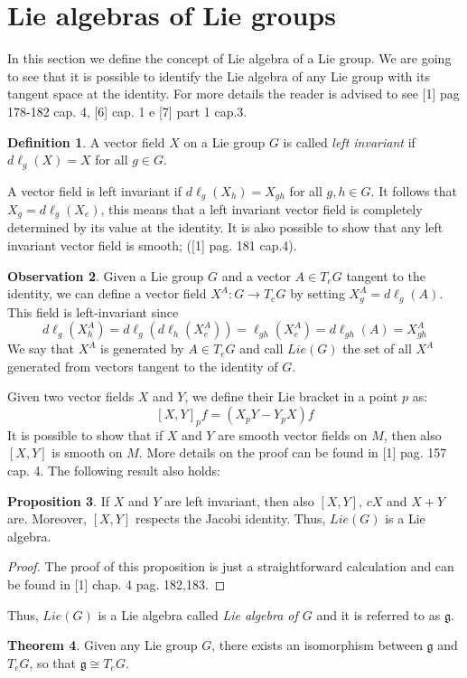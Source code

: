 \documentclass[12pt,a4paper]{report}
\theoremstyle{definition}
\newtheorem{Def}{Definition}[chapter]
\theoremstyle{Theorem}
\newtheorem{Theo}[Def]{Theorem}
\newtheorem{Prop}[Def]{Proposition}
\theoremstyle{definition}
\theoremstyle{definition}
\newtheorem{Obs}[Def]{Observation}
\begin{document}
	\section{Lie algebras of Lie groups}
	In this section we define the concept of Lie algebra of a Lie group. We are going to see that it is possible to identify the Lie algebra of any Lie group with its tangent space at the identity. For more details the reader is advised to see [1] pag 178-182 cap. 4, [6] cap. 1 e [7] part 1 cap.3.
	\begin{Def}
		A vector field $X$ on a Lie group $G$ is called \textit{left invariant} if $d\ell_g(X)=X$ for all $g\in G$.
	\end{Def}
	A vector field is left invariant if $d\ell_g(X_h)=X_{gh}$ for all $g,h\in G$.
	It follows that $X_g=d\ell_g(X_e)$, this means that a left invariant vector field is completely determined by its value at the identity. It is also possible to show that any left invariant vector field is smooth; ([1] pag. 181 cap.4).
	\begin{Obs} \label{Obs: 2.2}
		Given a Lie group $G$ and a vector $A\in T_eG$ tangent to the identity, we can define a vector field $X^A:G\rightarrow T_eG$ by setting $X^A_g=d\ell_g(A)$. This field is left-invariant since $$d\ell_g(X^A_h)=d\ell_g(d\ell_h(X^A_e))=\ell_{gh}(X^A_e)=d\ell_{gh}(A)=X^A_{gh}$$
		We say that $X^A$ is generated by $A\in T_eG$ and call $Lie(G)$ the set of all $X^A$ generated from vectors tangent to the identity of $G$.	
	\end{Obs}
	Given two vector fields $X$ and $Y$, we define their Lie bracket in a point $p$ as:
	$$[X,Y]_pf=(X_pY-Y_pX)f$$
	It is possible to show that if $X$ and $Y$ are smooth vector fields on $M$, then also $[X,Y]$ is smooth on $M$. More details on the proof can be found in [1] pag. 157 cap. 4. The following result also holds:
	\begin{Prop}
		If $X$ and $Y$ are left invariant, then also $[X,Y]$, $cX$ and $X+Y$ are. Moreover, $[X,Y]$ respects the Jacobi identity. Thus, $Lie(G)$ is a Lie algebra.
	\end{Prop}
	\begin{proof}
		The proof of this proposition is just a straightforward calculation and can be found in [1] chap. 4 pag. 182,183.
	\end{proof}
	Thus, $Lie(G)$ is a Lie algebra called \textit{Lie algebra of $G$} and it is referred to as $\mathfrak{g}$.
	\begin{Theo}
		Given any Lie group $G$, there exists an isomorphism between $\mathfrak{g}$ and $T_eG$, so that $\mathfrak{g}\cong T_eG$.
	\end{Theo}
\end{document}
